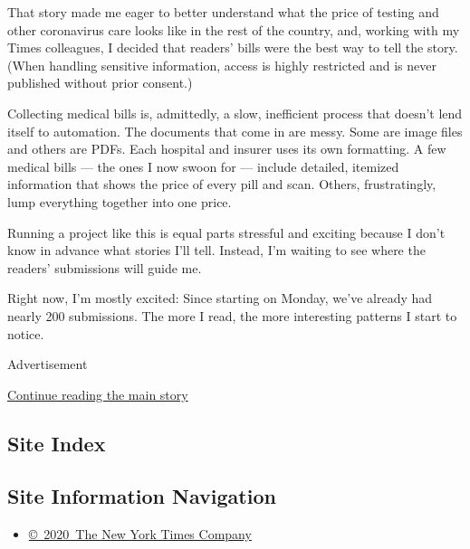 That story made me eager to better understand what the price of testing
and other coronavirus care looks like in the rest of the country, and,
working with my Times colleagues, I decided that readers' bills were the
best way to tell the story. (When handling sensitive information, access
is highly restricted and is never published without prior consent.)

Collecting medical bills is, admittedly, a slow, inefficient process
that doesn't lend itself to automation. The documents that come in are
messy. Some are image files and others are PDFs. Each hospital and
insurer uses its own formatting. A few medical bills --- the ones I now
swoon for --- include detailed, itemized information that shows the
price of every pill and scan. Others, frustratingly, lump everything
together into one price.

Running a project like this is equal parts stressful and exciting
because I don't know in advance what stories I'll tell. Instead, I'm
waiting to see where the readers' submissions will guide me.

Right now, I'm mostly excited: Since starting on Monday, we've already
had nearly 200 submissions. The more I read, the more interesting
patterns I start to notice.

Advertisement

\protect\hyperlink{after-bottom}{Continue reading the main story}

\hypertarget{site-index}{%
\subsection{Site Index}\label{site-index}}

\hypertarget{site-information-navigation}{%
\subsection{Site Information
Navigation}\label{site-information-navigation}}

\begin{itemize}
\tightlist
\item
  \href{https://help.nytimes3xbfgragh.onion/hc/en-us/articles/115014792127-Copyright-notice}{©~2020~The
  New York Times Company}
\end{itemize}

